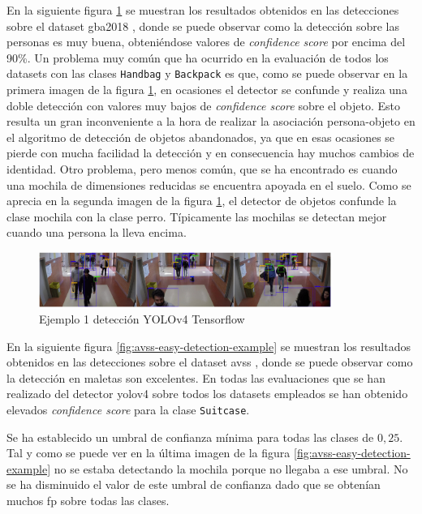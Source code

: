 En la siguiente figura \ref{fig:gba-near-big3-detection-example} se muestran los resultados obtenidos en las detecciones sobre el dataset \gls{gba2018} \cite{gba-dataset}, donde se puede observar como la detección sobre las personas es muy buena, obteniéndose valores de \textit{confidence score} por encima del 90\%. Un problema muy común que ha ocurrido en la evaluación de todos los datasets con las clases \texttt{Handbag} y \texttt{Backpack} es que, como se puede observar en la primera imagen de la figura \ref{fig:gba-near-big3-detection-example}, en ocasiones el detector se confunde y realiza una doble detección con valores muy bajos de \textit{confidence score} sobre el objeto. Esto resulta un gran inconveniente a la hora de realizar la asociación persona-objeto en el algoritmo de detección de objetos abandonados, ya que en esas ocasiones se pierde con mucha facilidad la detección y en consecuencia hay muchos cambios de identidad. Otro problema, pero menos común, que se ha encontrado es cuando una mochila de dimensiones reducidas se encuentra apoyada en el suelo. Como se aprecia en la segunda imagen de la figura \ref{fig:gba-near-big3-detection-example}, el detector de objetos confunde la clase mochila con la clase perro. Típicamente las mochilas se detectan mejor cuando una persona la lleva encima.

\begin{figure}[ht]
\centering
\includegraphics[width=0.85\textwidth]{img/chapters/resultados/deteccion/gba-near-big3-detection-example.jpg}
\caption{\label{fig:gba-near-big3-detection-example}Ejemplo 1 detección YOLOv4 Tensorflow \cite{gba-dataset}}
\end{figure}

En la siguiente figura \ref{fig:avss-easy-detection-example} se muestran los resultados obtenidos en las detecciones sobre el dataset \gls{avss} \cite{AVSSAB2007-dataset}, donde se puede observar como la detección en maletas son excelentes. En todas las evaluaciones que se han realizado del detector \gls{yolov4} sobre todos los datasets empleados se han obtenido elevados \textit{confidence score} para la clase \texttt{Suitcase}.

Se ha establecido un umbral de confianza mínima para todas las clases de $0,25$. Tal y como se puede ver en la última imagen de la figura \ref{fig:avss-easy-detection-example} no se estaba detectando la mochila porque no llegaba a ese umbral. No se ha disminuido el valor de este umbral de confianza dado que se obtenían muchos \gls{fp} sobre todas las clases.

